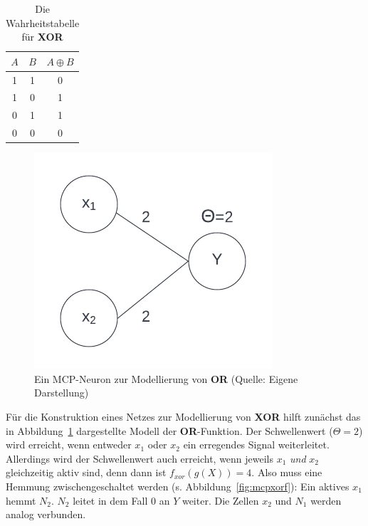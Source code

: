 \setlength{\tabcolsep}{1.5em}
{\renewcommand{\arraystretch}{1.5}%
\begin{table} %
    \centering
    \begin{tabular}{c | c | c}
        $A$ & $B$ & $A \oplus B$ \\
        \hline
        1   & 1   & 0           \\
        1   & 0   & 1           \\
        0   & 1   & 1           \\
        0   & 0   & 0           \\
    \end{tabular}
    \caption{Die Wahrheitstabelle für \textbf{XOR}}
    \label{tab:xor}
\end{table}

\begin{figure}[h]
    \centering
    \includegraphics{chapters/3. Kuenstliche Neuronen/images/mcpor}
    \caption{Ein MCP-Neuron zur Modellierung von \textbf{OR} (Quelle: Eigene Darstellung)}
    \label{fig:mcpor}
\end{figure}

Für die Konstruktion eines Netzes zur Modellierung von \textbf{XOR} hilft zunächst das in Abbildung~\ref{fig:mcpor} dargestellte Modell der \textbf{OR}-Funktion. Der Schwellenwert ($\Theta = 2$) wird erreicht, wenn entweder $x_1$ oder $x_2$ ein erregendes Signal weiterleitet.
Allerdings wird der Schwellenwert auch erreicht, wenn jeweils $x_1$ \textit{und} $x_2$ gleichzeitig aktiv sind, denn dann ist $f_{xor}(g(X)) = 4$.
Also muss eine Hemmung zwischengeschaltet werden (s. Abbildung~\ref{fig:mcpxorf}): Ein aktives $x_1$ hemmt $N_2$. $N_2$ leitet in dem Fall $0$ an $Y$ weiter.
Die Zellen $x_2$ und $N_1$ werden analog verbunden.

}
